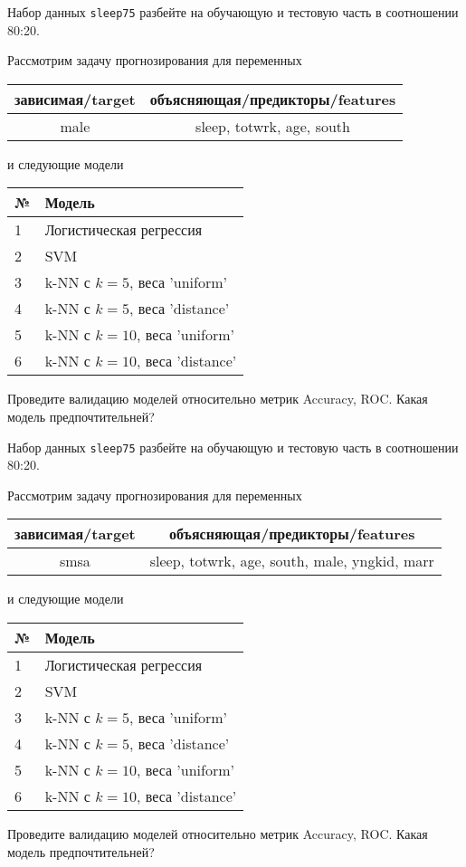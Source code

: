 \begin{exercise}
Набор данных \texttt{sleep75} разбейте на обучающую и тестовую часть
в соотношении 80:20.

Рассмотрим задачу прогнозирования для переменных
\begin{center}
	\begin{tabular}{|c|c|}\hline
		зависимая/target & объясняющая/предикторы/features \\ \hline
		male & sleep, totwrk, age, south \\ \hline
	\end{tabular}
\end{center}
и следующие модели
\begin{center}
	\begin{tabular}{|l|l|}\hline
		№ & Модель \\ \hline
		1 & Логистическая регрессия\\
		2 & SVM \\ 
		3 & k-NN с \(k=5\), веса 'uniform' \\
		4 & k-NN с \(k=5\), веса 'distance' \\
		5 & k-NN с \(k=10\), веса 'uniform' \\
		6 & k-NN с \(k=10\), веса 'distance' \\ \hline
	\end{tabular}
\end{center}
Проведите валидацию моделей относительно метрик Accuracy, ROC. 
Какая модель предпочтительней?
\end{exercise}

\begin{exercise}
Набор данных \texttt{sleep75} разбейте на обучающую и тестовую часть
в соотношении 80:20.

Рассмотрим задачу прогнозирования для переменных
\begin{center}
	\begin{tabular}{|c|c|}\hline
		зависимая/target & объясняющая/предикторы/features \\ \hline
		smsa & sleep, totwrk, age, south, male, yngkid, marr \\ \hline
	\end{tabular}
\end{center}
и следующие модели
\begin{center}
	\begin{tabular}{|l|l|}\hline
		№ & Модель \\ \hline
		1 & Логистическая регрессия\\
		2 & SVM \\ 
		3 & k-NN с \(k=5\), веса 'uniform' \\
		4 & k-NN с \(k=5\), веса 'distance' \\
		5 & k-NN с \(k=10\), веса 'uniform' \\
		6 & k-NN с \(k=10\), веса 'distance' \\ \hline
	\end{tabular}
\end{center}
Проведите валидацию моделей относительно метрик Accuracy, ROC. Какая модель предпочтительней?
\end{exercise}

